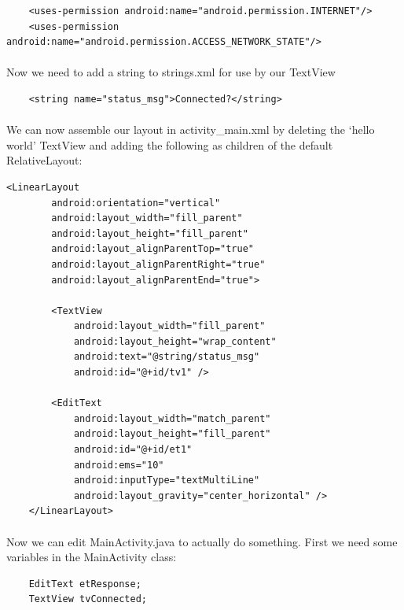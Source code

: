 \begin{lstlisting}
    <uses-permission android:name="android.permission.INTERNET"/>
    <uses-permission android:name="android.permission.ACCESS_NETWORK_STATE"/>
\end{lstlisting}
       
\paragraph{} Now we need to add a string to strings.xml for use by our TextView

\begin{lstlisting}
    <string name="status_msg">Connected?</string>
\end{lstlisting}

\paragraph{} We can now assemble our layout in activity\_main.xml by deleting the `hello world' TextView and adding the following as children of the default RelativeLayout:

\begin{lstlisting}
<LinearLayout
        android:orientation="vertical"
        android:layout_width="fill_parent"
        android:layout_height="fill_parent"
        android:layout_alignParentTop="true"
        android:layout_alignParentRight="true"
        android:layout_alignParentEnd="true">

        <TextView
            android:layout_width="fill_parent"
            android:layout_height="wrap_content"
            android:text="@string/status_msg"
            android:id="@+id/tv1" />

        <EditText
            android:layout_width="match_parent"
            android:layout_height="fill_parent"
            android:id="@+id/et1"
            android:ems="10"
            android:inputType="textMultiLine"
            android:layout_gravity="center_horizontal" />
    </LinearLayout>
\end{lstlisting}

\paragraph{} Now we can edit MainActivity.java to actually do something. First we need some variables in the MainActivity class:

\begin{lstlisting}
    EditText etResponse;
    TextView tvConnected;
\end{lstlisting}


